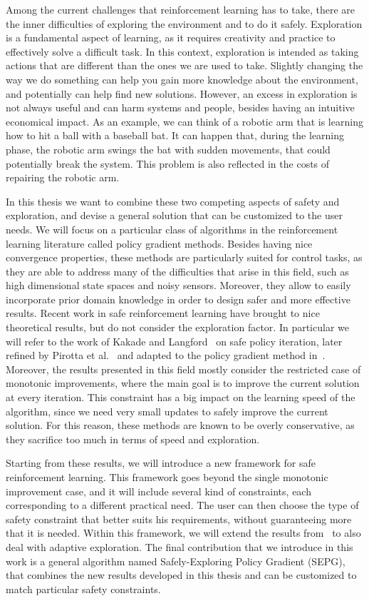 Among the current challenges that reinforcement learning has to take, there are the inner difficulties of exploring the environment and to do it safely. Exploration is a fundamental aspect of learning, as it requires creativity and practice to effectively solve a difficult task. In this context, exploration is intended as taking actions that are different than the ones we are used to take. Slightly changing the way we do something can help you gain more knowledge about the environment, and potentially can help find new solutions. However, an excess in exploration is not always useful and can harm systems and people, besides having an intuitive economical impact. As an example, we can think of a robotic arm that is learning how to hit a ball with a baseball bat. It can happen that, during the learning phase, the robotic arm swings the bat with sudden movements, that could potentially break the system. This problem is also reflected in the costs of repairing the robotic arm.

In this thesis we want to combine these two competing aspects of safety and exploration, and devise a general solution that can be customized to the user needs. We will focus on a particular class of algorithms in the reinforcement learning literature called policy gradient methods. Besides having nice convergence properties, these methods are particularly suited for control tasks, as they are able to address many of the difficulties that arise in this field, such as high dimensional state spaces and noisy sensors. Moreover, they allow to easily incorporate prior domain knowledge in order to design safer and more effective results. Recent work in safe reinforcement learning have brought to nice theoretical results, but do not consider the exploration factor. In particular we will refer to the work of Kakade and Langford~\cite{Kakade02approximatelyoptimal} on safe policy iteration, later refined by Pirotta et al.~\cite{safe_iteration} and adapted to the policy gradient method in~\cite{adaptive_step}. Moreover, the results presented in this field mostly consider the restricted case of monotonic improvements, where the main goal is to improve the current solution at every iteration. This constraint has a big impact on the learning speed of the algorithm, since we need very small updates to safely improve the current solution. For this reason, these methods are known to be overly conservative, as they sacrifice too much in terms of speed and exploration. 

Starting from these results, we will introduce a new framework for safe reinforcement learning. This framework goes beyond the single monotonic improvement case, and it will include several kind of constraints, each corresponding to a different practical need. The user can then choose the type of safety constraint that better suits his requirements, without guaranteeing more that it is needed. Within this framework, we will extend the results from~\cite{adaptive_step} to also deal with adaptive exploration. The final contribution that we introduce in this work is a general algorithm named Safely-Exploring Policy Gradient (SEPG), that combines the new results developed in this thesis and can be customized to match particular safety constraints. 

